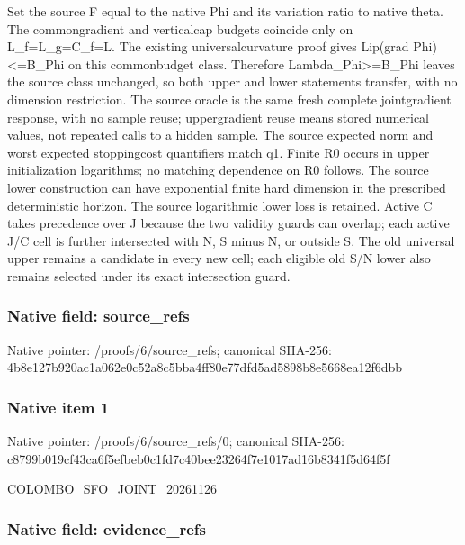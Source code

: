 \documentclass[10pt,a4paper]{article}
\begin{document}
Set the source F equal to the native Phi and its variation ratio to native theta. The commongradient and verticalcap budgets coincide only on L\_f=L\_g=C\_f=L. The existing universalcurvature proof gives Lip(grad Phi)<=B\_Phi on this commonbudget class. Therefore Lambda\_Phi>=B\_Phi leaves the source class unchanged, so both upper and lower statements transfer, with no dimension restriction. The source oracle is the same fresh complete jointgradient response, with no sample reuse; uppergradient reuse means stored numerical values, not repeated calls to a hidden sample. The source expected norm and worst expected stoppingcost quantifiers match q1. Finite R0 occurs in upper initialization logarithms; no matching dependence on R0 follows. The source lower construction can have exponential finite hard dimension in the prescribed deterministic horizon. The source logarithmic lower loss is retained. Active C takes precedence over J because the two validity guards can overlap; each active J/C cell is further intersected with N, S minus N, or outside S. The old universal upper remains a candidate in every new cell; each eligible old S/N lower also remains selected under its exact intersection guard.


\subsubsection{Native field: source\_refs}


Native pointer: /proofs/6/source\_refs; canonical SHA-256: 4b8e127b920ac1a062e0c52a\allowbreak{}8c5bba4ff80e77dfd5ad5898\allowbreak{}b8e5668ea12f6dbb



\subsubsection{Native item 1}


Native pointer: /proofs/6/source\_refs/0; canonical SHA-256: c8799b019cf43ca6f5efbeb0\allowbreak{}c1fd7c40bee23264f7e1017a\allowbreak{}d16b8341f5d64f5f


COLOMBO\_SFO\_JOINT\_20261126


\subsubsection{Native field: evidence\_refs}
\end{document}
